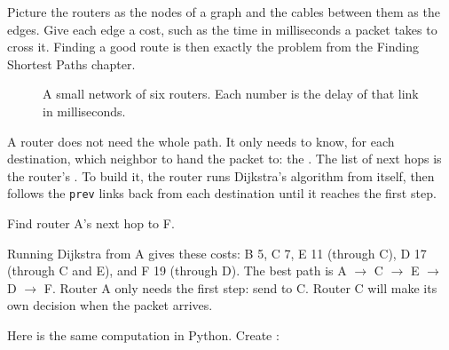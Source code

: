 Picture the routers as the nodes of a graph and the cables between them as the edges. Give each edge a
cost, such as the time in milliseconds a packet takes to cross it. Finding a good route is then exactly
the problem from the Finding Shortest Paths chapter.

\begin{figure}[htbp]
\centering
{}
\caption{A small network of six routers. Each number is the delay of that link in milliseconds.}
\label{fig:router-network}
\end{figure}

A router does not need the whole path. It only needs to know, for each destination, which neighbor to hand
the packet to: the . The list of next hops is the router's . To build it, the router runs Dijkstra's algorithm from itself, then follows
the \verb|prev| links back from each destination until it reaches the first step.

\begin{Worked}
\begin{Problem}
Find router A's next hop to F.
\end{Problem}
\begin{Solution}
Running Dijkstra from A gives these costs: B 5, C 7, E 11 (through C), D 17 (through C
and E), and F 19 (through D). The best path is A $\to$ C $\to$ E $\to$ D $\to$ F. Router A only needs the
first step: send to C. Router C will make its own decision when the packet arrives.
\end{Solution}
\end{Worked}

Here is the same computation in Python. Create :

